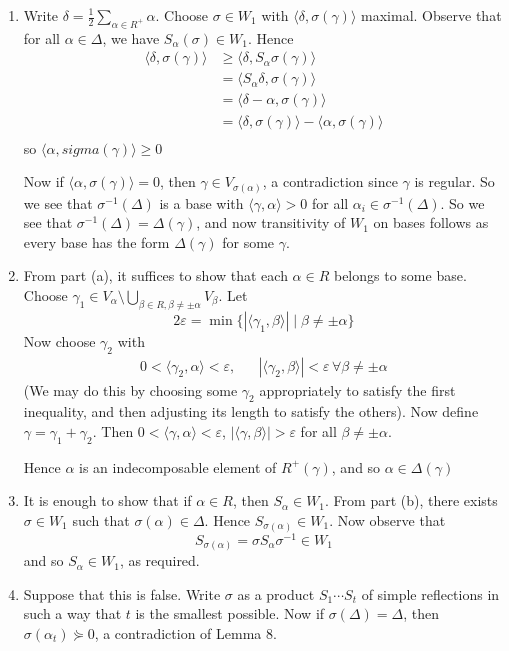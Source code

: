 \documentclass[x11names,reqno,14pt]{extarticle}
\begin{document}
\begin{enumerate}[label=(\alph*)]

\item Write $\delta = \frac12\sum_{\alpha\in R^+}\alpha$. Choose $\sigma\in W_1$ with $\langle\delta,\sigma(\gamma)\rangle$ maximal.  Observe that for all $\alpha\in\Delta$, we have $S_\alpha(\sigma)\in W_1$. Hence
\begin{align*}
\langle\delta,\sigma(\gamma)\rangle & \geq \langle \delta, S_\alpha\sigma(\gamma)\rangle\\
& = \langle S_\alpha\delta, \sigma(\gamma)\rangle\\
& = \langle\delta-\alpha,\sigma(\gamma)\rangle\\
& = \langle\delta,\sigma(\gamma)\rangle - \langle \alpha,\sigma(\gamma)\rangle \\
\end{align*}
so $\langle\alpha,sigma(\gamma)\rangle \geq0$

Now if $\langle\alpha,\sigma(\gamma)\rangle=0$, then $\gamma \in V_{\sigma(\alpha)}$, a contradiction since $\gamma$ is regular. So we see that $\sigma^{-1}(\Delta)$ is a base with $\langle\gamma,\alpha\rangle>0$ for all $\alpha_i\in\sigma^{-1}(\Delta)$. So we see that $\sigma^{-1}(\Delta) = \Delta(\gamma)$, and now transitivity of $W_1$ on bases follows as every base has the form $\Delta(\gamma)$ for some $\gamma$.

\item From part (a), it suffices to show that each $\alpha \in R$ belongs to some base. Choose $\gamma_1\in V_\alpha\setminus\bigcup_{\beta\in R, \beta\neq\pm\alpha}V_\beta$. Let 
\[
2\varepsilon = \min\{|\langle\gamma_1,\beta\rangle|\mid\beta\neq\pm\alpha\}
\]
Now choose $\gamma_2$ with 
\begin{align*}
0<\langle\gamma_2,\alpha\rangle<\varepsilon, & & |\langle\gamma_2,\beta\rangle| < \varepsilon\,\forall \beta\neq\pm\alpha
\end{align*}
(We may do this by choosing some $\gamma_2$ appropriately to satisfy the first inequality, and then adjusting its length to satisfy the others). Now define $\gamma =\gamma_1 + \gamma_2$. Then $0<\langle\gamma,\alpha\rangle<\varepsilon$, $|\langle\gamma,\beta\rangle| > \varepsilon$ for all $\beta\neq\pm\alpha$.

Hence $\alpha$ is an indecomposable element of $R^+(\gamma)$, and so $\alpha\in\Delta(\gamma)$

\item It is enough to show that if $\alpha\in R$, then $S_\alpha \in W_1$. From part (b), there exists $\sigma\in W_1$ such that $\sigma(\alpha)\in\Delta$. Hence $S_{\sigma(\alpha)}\in W_1$. Now observe that 
\[
S_{\sigma(\alpha)} = \sigma S_\alpha \sigma^{-1} \in W_1
\]
and so $S_\alpha \in W_1$, as required.

\item Suppose that this is false. Write $\sigma$ as a product $S_1\cdots S_t$ of simple reflections in such a way that $t$ is the smallest possible. Now if $\sigma(\Delta) = \Delta$, then $\sigma(\alpha_t)\curlyeqsucc0$, a contradiction of Lemma 8. 

\end{enumerate}
\end{document}
